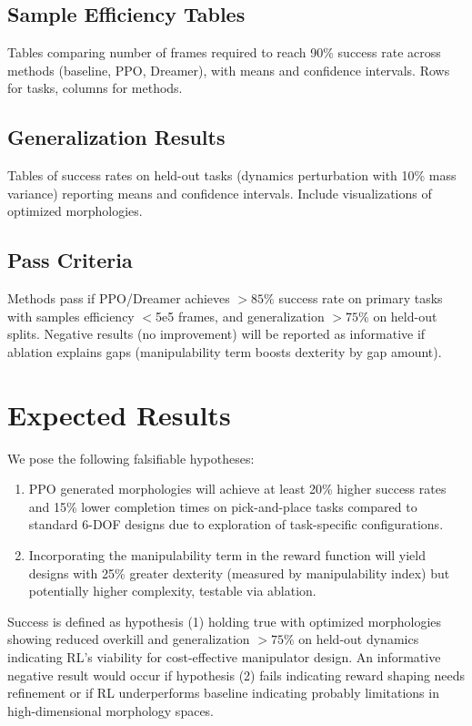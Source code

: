 \documentclass[conference]{IEEEtran}
\begin{document}
\subsection{Sample Efficiency Tables}
Tables comparing number of frames required to reach 90\% success rate across methods (baseline, PPO, Dreamer), with means and confidence intervals.
Rows for tasks, columns for methods.

\subsection{Generalization Results}
Tables of success rates on held-out tasks (dynamics perturbation with 10\% mass variance) reporting means and confidence intervals.
Include visualizations of optimized morphologies.

\subsection{Pass Criteria}
Methods pass if PPO/Dreamer achieves $>85\%$ success rate on primary tasks with samples efficiency $<$5e5 frames, and generalization $>75\%$ on held-out splits.
Negative results (no improvement) will be reported as informative if ablation explains gaps (manipulability term boosts dexterity by gap amount).

\section{Expected Results}
We pose the following falsifiable hypotheses:
\begin{enumerate}
    \item PPO generated morphologies will achieve at least 20\% higher success rates and 15\% lower completion times on pick-and-place tasks compared to standard 6-DOF designs due to exploration of task-specific configurations.
    \item Incorporating the manipulability term in the reward function will yield designs with 25\% greater dexterity (measured by manipulability index) but potentially higher complexity, testable via ablation.
\end{enumerate}

Success is defined as hypothesis (1) holding true with optimized morphologies showing reduced overkill and generalization $>75\%$ on held-out dynamics indicating RL's viability for cost-effective manipulator design.
An informative negative result would occur if hypothesis (2) fails indicating reward shaping needs refinement or if RL underperforms baseline indicating probably limitations in high-dimensional morphology spaces.
\end{document}
